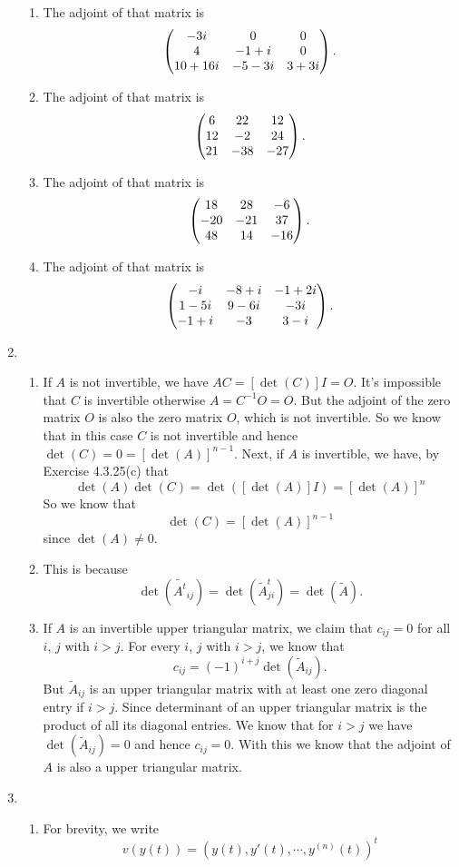 \begin{enumerate}
\begin{enumerate}
\item The adjoint of that matrix is $$\begin{pmatrix}-3i & 0 & 0\cr 4 & -1+i & 0\cr 10+16i & -5-3i  & 3+3i\end{pmatrix}.$$
\item The adjoint of that matrix is $$\begin{pmatrix}6 & 22 & 12\cr 12 & -2 & 24\cr 21 & -38 & -27\end{pmatrix}.$$
\item The adjoint of that matrix is $$\begin{pmatrix}18 & 28 & -6\cr -20 & -21 & 37\cr 48 & 14 & -16\end{pmatrix}.$$
\item The adjoint of that matrix is $$\begin{pmatrix}-i&-8+i&-1+2i\cr 1-5i&9-6i&-3i\cr -1+i&-3&3-i\end{pmatrix}.$$
\end{enumerate}
\item \begin{enumerate}
\item If $A$ is not invertible, we have $AC=[\det(C)]I=O$. It's impossible that $C$ is invertible otherwise $A=C^{-1}O=O$. But the adjoint of the zero matrix $O$ is also the zero matrix $O$, which is not invertible. So we know that in this case $C$ is not invertible and hence $\det(C)=0=[\det(A)]^{n-1}$. Next, if $A$ is invertible, we have, by Exercise 4.3.25(c) that 
\[\det(A)\det(C)=\det([\det(A)]I)=[\det(A)]^n\]
So we know that 
\[\det(C)=[\det(A)]^{n-1}\]
since $\det(A)\neq 0$.
\item This is because \[\det(\tilde{A^t}_{ij})=\det(\tilde{A}_{ji}^t)=\det(\tilde{A}).\]
\item If $A$ is an invertible upper triangular matrix, we claim that $c_{ij}=0$ for all $i$, $j$ with $i>j$. For every $i$, $j$ with $i>j$, we know that 
\[c_{ij}=(-1)^{i+j}\det(\tilde{A}_{ij}).\]
But $\tilde{A}_{ij}$ is an upper triangular matrix with at least one zero diagonal entry if $i>j$. Since determinant of an upper triangular matrix is the product of all its diagonal entries. We know that for $i>j$ we have $\det(\tilde{A}_{ij})=0$ and hence $c_{ij}=0$. With this we know that the adjoint of $A$ is also a upper triangular matrix.
\end{enumerate}
\item \begin{enumerate}
\item For brevity, we write 
\[v(y(t))=(y(t),y'(t),\cdots ,y^{(n)}(t))^t\]

\end{enumerate}
\end{enumerate}
